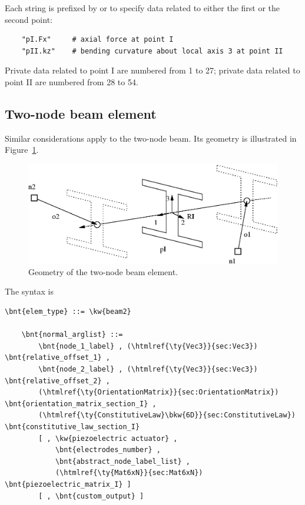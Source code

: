 Each string is prefixed by  or 
to specify data related to either the first or the second point:
\begin{verbatim}
    "pI.Fx"     # axial force at point I
    "pII.kz"    # bending curvature about local axis 3 at point II
\end{verbatim}
Private data related to point I are numbered from 1 to 27;
private data related to point II are numbered from 28 to 54.








\subsection{Two-node beam element}
\label{sec:EL:BEAM:BEAM2}
Similar considerations apply to the two-node beam.
Its geometry is illustrated in Figure~\ref{fig:EL:BEAM:beam2}.

\begin{figure}
\centering
{}
\includegraphics[width=.7\textwidth]{beam2}
\caption{Geometry of the two-node beam element.}
\label{fig:EL:BEAM:beam2}
\end{figure}

The syntax is
\begin{Verbatim}[commandchars=\\\{\}]
    \bnt{elem_type} ::= \kw{beam2}

    \bnt{normal_arglist} ::=
        \bnt{node_1_label} , (\htmlref{\ty{Vec3}}{sec:Vec3}) \bnt{relative_offset_1} ,
        \bnt{node_2_label} , (\htmlref{\ty{Vec3}}{sec:Vec3}) \bnt{relative_offset_2} ,
        (\htmlref{\ty{OrientationMatrix}}{sec:OrientationMatrix}) \bnt{orientation_matrix_section_I} ,
        (\htmlref{\ty{ConstitutiveLaw}\bkw{6D}}{sec:ConstitutiveLaw}) \bnt{constitutive_law_section_I}
        [ , \kw{piezoelectric actuator} , 
            \bnt{electrodes_number} ,
            \bnt{abstract_node_label_list} ,
            (\htmlref{\ty{Mat6xN}}{sec:Mat6xN}) \bnt{piezoelectric_matrix_I} ]
        [ , \bnt{custom_output} ]
\end{Verbatim}

